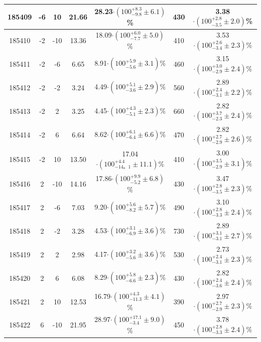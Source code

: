 \begin{table}[ht!]
{\begin{tabular}{c|c|c|c|c|c|c}
185409 & -6    &  10  &  21.66   &    28.23$\cdot (100^{+8.3}_{-9.8}\pm 6.1 )$\%   &    430       &           3.38$\cdot (100^{+2.8}_{-3.5}\pm 2.0 )$\%\\
\hline
185410 & -2    &  -10 &  13.36   &    18.09$\cdot (100^{+6.0}_{-7.7}\pm  5.0 )$\%   &    410       &           3.53$\cdot (100^{+2.6}_{-3.4}\pm 2.3)$\%\\
185411 & -2    &  -6  &  6.65    &    8.91$\cdot (100^{+5.9}_{-5.6}\pm 3.1  )$\%    &    460       &           3.15$\cdot (100^{+3.0}_{-2.9}\pm 2.4)$\%\\
185412 & -2    &  -2  &  3.24    &    4.49$\cdot (100^{+5.1}_{-3.6}\pm 2.9 )$\%    &    560       &           2.89$\cdot (100^{+2.4}_{-3.1}\pm 2.2)$\%\\
185413 & -2    &  2   &  3.25    &    4.45$\cdot (100^{+4.3}_{-5.1}\pm 2.3 )$\%    &    660       &           2.82$\cdot (100^{+3.7}_{-2.3}\pm 2.4 )$\%\\
185414 & -2    &  6   &  6.64    &    8.62$\cdot (100^{+6.1}_{-6.4}\pm 6.6 )$\%    &    470       &           2.82$\cdot (100^{+2.7}_{-2.9}\pm 2.6)$\%\\
185415 & -2    &  10  &  13.50    &    17.04$\cdot (100^{+4.4}_{-14。1}\pm 11.1 )$\%   &   410       &           3.00$\cdot (100^{+3.5}_{-2.9}\pm 3.1)$\%\\
\hline
185416 & 2     &  -10 &  14.16   &    17.86$\cdot (100^{+9.9}_{-5.2}\pm 6.8 )$\%   &    430       &           3.47$\cdot (100^{+2.8}_{-3.5}\pm 2.3 )$\%\\ 
185417 & 2     &  -6  &  7.03    &    9.20$\cdot (100^{+5.6}_{-8.2}\pm 5.7 )$\%     &   490       &           3.10$\cdot (100^{+2.8}_{-3.3}\pm 2.4)$\%\\
185418 & 2     &  -2  &  3.28    &    4.53$\cdot (100^{+3.1}_{-6.9}\pm 3.6 )$\%    &    730       &           2.89$\cdot (100^{+3.1}_{-3.1}\pm 2.7 )$\%\\
185419 & 2     &  2   &  2.98    &    4.17$\cdot (100^{+3.2}_{-5.6}\pm 3.6 )$\%    &    530       &           2.73$\cdot (100^{+2.4}_{-3.1}\pm 2.3 )$\%\\
185420 & 2     &  6   &  6.08    &    8.29$\cdot (100^{+5.8}_{-6.6}\pm 2.3 )$\%    &    430       &           2.82$\cdot (100^{+2.4}_{-3.6}\pm 2.4 )$\%\\
185421 & 2     &  10  &  12.53   &    16.79$\cdot (100^{+4.3}_{-11.3}\pm 4.1 )$\%   &    390       &           2.97$\cdot (100^{+2.7}_{-2.9}\pm 2.3 )$\%\\
\hline
185422 & 6     &  -10 &  21.95   &    28.97$\cdot (100^{+17.1}_{-3.4}\pm 9.0 )$\%   &    450       &           3.78$\cdot (100^{+2.8}_{-3.3}\pm 2.4 )$\%\\ 

\end{tabular}}
\end{table}
